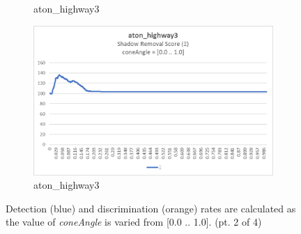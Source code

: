 \begin{appendices}
\begin{figure}
\begin{subfigure}{.45\linewidth}
  \caption{aton\_highway3}
\end{subfigure}
\hfill
\begin{subfigure}{.45\linewidth}
  \includegraphics[width=1\linewidth]{figures/appendix/highway3_coneAngle_score.jpg}
  \caption{aton\_highway3}
\end{subfigure}

\caption{Detection (blue) and discrimination (orange) rates are calculated as the value of \textit{coneAngle} is varied from [0.0 .. 1.0]. (pt. 2 of 4)}
\end{figure}


\end{appendices}
